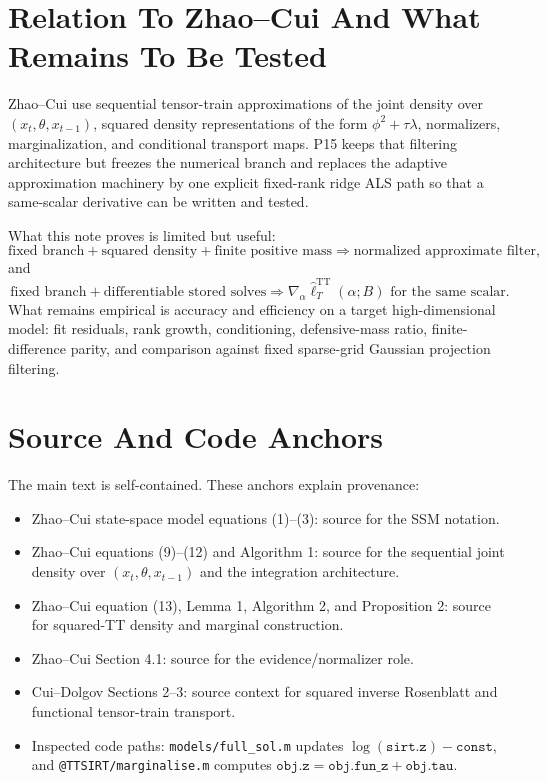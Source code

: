 \documentclass[11pt]{article}
\newcommand{\TT}{\mathrm{TT}}
\theoremstyle{definition}
\theoremstyle{remark}
\renewcommand{\[}{\begin{equation}}
\renewcommand{\]}{\end{equation}}
\begin{document}
\section{Relation To Zhao--Cui And What Remains To Be Tested}

Zhao--Cui use sequential tensor-train approximations of the joint density over
\((x_t,\theta,x_{t-1})\), squared density representations of the form
\(\phi^2+\tau\lambda\), normalizers, marginalization, and conditional
transport maps.  P15 keeps that filtering architecture but freezes the
numerical branch and replaces the adaptive approximation machinery by one
explicit fixed-rank ridge ALS path so that a same-scalar derivative can be
written and tested.

What this note proves is limited but useful:
\[
  \text{fixed branch}+\text{squared density}+\text{finite positive mass}
  \Longrightarrow
  \text{normalized approximate filter},
\]
and
\[
  \text{fixed branch}+\text{differentiable stored solves}
  \Longrightarrow
  \nabla_\alpha\widehat\ell_T^{\TT}(\alpha;B)
  \text{ for the same scalar.}
\]
What remains empirical is accuracy and efficiency on a target high-dimensional
model: fit residuals, rank growth, conditioning, defensive-mass ratio,
finite-difference parity, and comparison against fixed sparse-grid Gaussian
projection filtering.

\appendix
\section{Source And Code Anchors}

The main text is self-contained.  These anchors explain provenance:
\begin{itemize}[leftmargin=*]
\item Zhao--Cui state-space model equations (1)--(3): source for the SSM
notation.
\item Zhao--Cui equations (9)--(12) and Algorithm 1: source for the sequential
joint density over \((x_t,\theta,x_{t-1})\) and the integration architecture.
\item Zhao--Cui equation (13), Lemma 1, Algorithm 2, and Proposition 2: source
for squared-TT density and marginal construction.
\item Zhao--Cui Section 4.1: source for the evidence/normalizer role.
\item Cui--Dolgov Sections 2--3: source context for squared inverse
Rosenblatt and functional tensor-train transport.
\item Inspected code paths: \texttt{models/full\_sol.m} updates
\(\log(\texttt{sirt.z})-\texttt{const}\), and
\texttt{@TTSIRT/marginalise.m} computes
\(\texttt{obj.z}=\texttt{obj.fun\_z}+\texttt{obj.tau}\).
\end{itemize}
\end{document}
